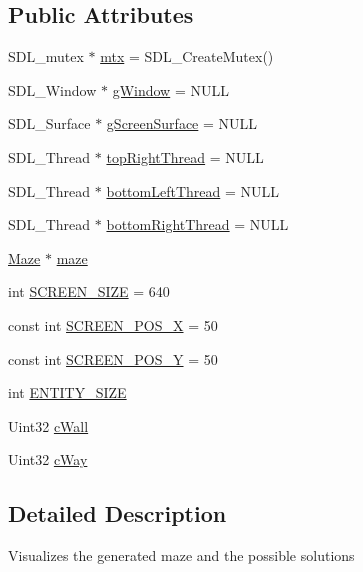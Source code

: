 \subsection*{Public Attributes}
\begin{DoxyCompactItemize}
\item 
S\+D\+L\+\_\+mutex $\ast$ \hyperlink{class_visualizer_af3cda6322743e852a05cdc6677727752}{mtx} = S\+D\+L\+\_\+\+Create\+Mutex()
\item 
S\+D\+L\+\_\+\+Window $\ast$ \hyperlink{class_visualizer_a7bf9d248519e29ed8083706569c663c5}{g\+Window} = N\+U\+LL
\item 
S\+D\+L\+\_\+\+Surface $\ast$ \hyperlink{class_visualizer_aa484855f44f50a0dedfe23a53e02b856}{g\+Screen\+Surface} = N\+U\+LL
\item 
S\+D\+L\+\_\+\+Thread $\ast$ \hyperlink{class_visualizer_a0aed37d9a5c9c7f89bfb5a87e4cf3898}{top\+Right\+Thread} = N\+U\+LL
\item 
S\+D\+L\+\_\+\+Thread $\ast$ \hyperlink{class_visualizer_ad53bf4446b78642564095f8733f0310e}{bottom\+Left\+Thread} = N\+U\+LL
\item 
S\+D\+L\+\_\+\+Thread $\ast$ \hyperlink{class_visualizer_a27e00041c805a99b433fcea5e0f2b678}{bottom\+Right\+Thread} = N\+U\+LL
\item 
\hyperlink{class_maze}{Maze} $\ast$ \hyperlink{class_visualizer_a6a395e1836267177157554215304cb15}{maze}
\item 
int \hyperlink{class_visualizer_a5dab241289bfd894f141b07a0f34f70d}{S\+C\+R\+E\+E\+N\+\_\+\+S\+I\+ZE} = 640
\item 
const int \hyperlink{class_visualizer_a5c699928671f8be884b1d7801c242490}{S\+C\+R\+E\+E\+N\+\_\+\+P\+O\+S\+\_\+X} = 50
\item 
const int \hyperlink{class_visualizer_a96ed3b95d01478071f5bfe091871488c}{S\+C\+R\+E\+E\+N\+\_\+\+P\+O\+S\+\_\+Y} = 50
\item 
int \hyperlink{class_visualizer_a2d78c20644f717427431a22a23dbcf6b}{E\+N\+T\+I\+T\+Y\+\_\+\+S\+I\+ZE}
\item 
Uint32 \hyperlink{class_visualizer_aa085df305d7d462052b8b1bc8870c581}{c\+Wall}
\item 
Uint32 \hyperlink{class_visualizer_a96d89d736020641b4aa7a8153568c143}{c\+Way}
\end{DoxyCompactItemize}


\subsection{Detailed Description}
Visualizes the generated maze and the possible solutions 

